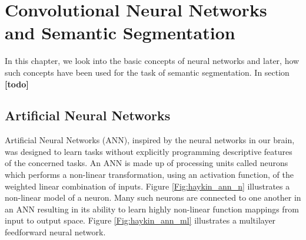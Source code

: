 
\chapter{Convolutional Neural Networks and Semantic Segmentation}

	In this chapter, we look into the basic concepts of neural networks and later, how such concepts have been used for the task of semantic segmentation. In section  \textbf{[todo]}

\section{Artificial Neural Networks}

Artificial Neural Networks (ANN), inspired by the neural networks in our brain, was designed to learn tasks without explicitly programming descriptive features of the concerned tasks. An ANN is made up of processing units called neurons which performs a non-linear transformation, using an activation function, of the weighted linear combination of inputs. Figure \ref{Fig:haykin_ann_n} illustrates a non-linear model of a neuron. Many such neurons are connected to one another in an ANN resulting in its ability to learn highly non-linear function mappings from input to output space. Figure \ref{Fig:haykin_ann_ml} illustrates a multilayer feedforward neural network.

